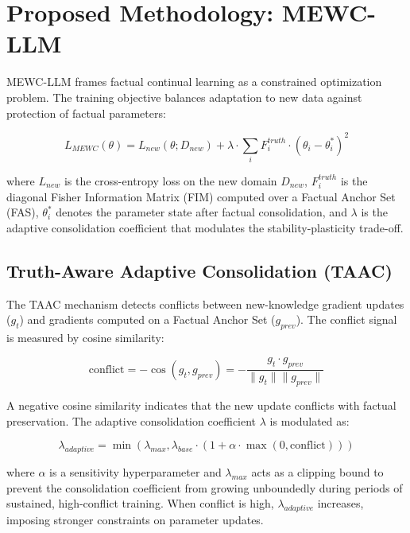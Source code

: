 \documentclass[10pt, conference, letterpaper]{IEEEtran}
\begin{document}
\section{Proposed Methodology: MEWC-LLM}

MEWC-LLM frames factual continual learning as a constrained optimization problem. The training objective balances adaptation to new data against protection of factual parameters:

\begin{equation}
L_{MEWC}(\theta) = L_{new}(\theta; D_{new}) + \lambda \cdot \sum_i F_i^{truth} \cdot (\theta_i - \theta_i^*)^2
\end{equation}

where $L_{new}$ is the cross-entropy loss on the new domain $D_{new}$, $F_i^{truth}$ is the diagonal Fisher Information Matrix (FIM) computed over a Factual Anchor Set (FAS), $\theta_i^*$ denotes the parameter state after factual consolidation, and $\lambda$ is the adaptive consolidation coefficient that modulates the stability-plasticity trade-off.

\subsection{Truth-Aware Adaptive Consolidation (TAAC)}
The TAAC mechanism detects conflicts between new-knowledge gradient updates ($g_t$) and gradients computed on a Factual Anchor Set ($g_{prev}$). The conflict signal is measured by cosine similarity:

\begin{equation}
\text{conflict} = -\cos(g_t, g_{prev}) = -\frac{g_t \cdot g_{prev}}{\|g_t\| \|g_{prev}\|}
\end{equation}

A negative cosine similarity indicates that the new update conflicts with factual preservation. The adaptive consolidation coefficient $\lambda$ is modulated as:

\begin{equation}
\lambda_{adaptive} = \min \left( \lambda_{max}, \lambda_{base} \cdot (1 + \alpha \cdot \max(0, \text{conflict})) \right)
\end{equation}

where $\alpha$ is a sensitivity hyperparameter and $\lambda_{max}$ acts as a clipping bound to prevent the consolidation coefficient from growing unboundedly during periods of sustained, high-conflict training. When conflict is high, $\lambda_{adaptive}$ increases, imposing stronger constraints on parameter updates.
\end{document}
